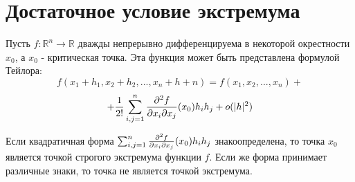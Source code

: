 \section*{Достаточное условие экстремума}
Пусть $f: \mathbb{R}^n \to \mathbb{R}$ дважды непрерывно дифференцируема в некоторой окрестности $x_0$, а $x_0$ - критическая точка. Эта функция может быть представлена формулой Тейлора:
$$f(x_1+h_1,x_2+h_2,...,x_n+h+n)= f(x_1,x_2,...,x_n)+$$
$$+ {1 \over 2!} \sum_{i,j=1}^{n}{{\partial^2 f \over \partial x_i \partial x_j}(x_0)h_i h_j} + o(|h|^2)$$
\begin{theorem}
Если квадратичная форма $\sum_{i,j=1}^{n}{{\partial^2 f \over \partial x_i \partial x_j}(x_0)h_i h_j}$ знакоопределена, то точка $x_0$ является точкой строгого экстремума функции $f$. Если же форма принимает различные знаки, то точка не является точкой экстремума.
\end{theorem}
